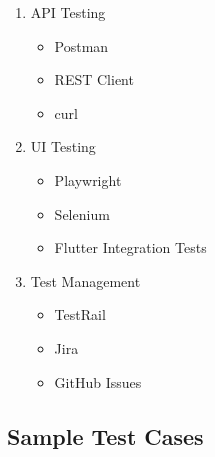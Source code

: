 \begin{enumerate}
    \item API Testing
    \begin{itemize}
        \item Postman
        \item REST Client
        \item curl
    \end{itemize}
    
    \item UI Testing
    \begin{itemize}
        \item Playwright
        \item Selenium
        \item Flutter Integration Tests
    \end{itemize}
    
    \item Test Management
    \begin{itemize}
        \item TestRail
        \item Jira
        \item GitHub Issues
    \end{itemize}
\end{enumerate}

\subsection{Sample Test Cases}

